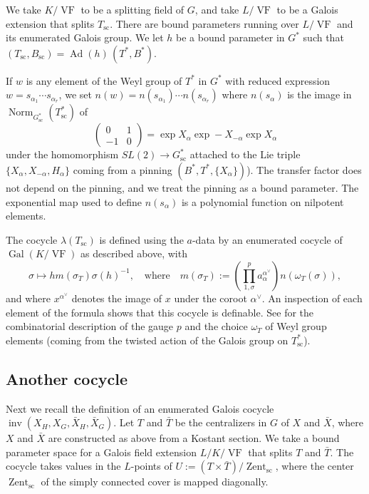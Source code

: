 \documentclass[12pt]{amsart}
\newcommand{\op}[1]{\operatorname{#1}}
\def\VF{{\op{VF}}}
\theoremstyle{plain}
\theoremstyle{definition}
\begin{document}
We take $K/\VF$ to be a splitting field of $G$, and take $L/\VF$ to be
a Galois extension that splits $T_{\text{sc}}$.  There are bound parameters
running over $L/\VF$ and its enumerated Galois group.  We let $h$ be a
bound parameter in $G^*$ such that $(T_{\text{sc}},B_{\text{sc}}) =
\op{Ad}(h)\,(T^*,B^*)$.

If $w$ is any element of the Weyl group of $T^*$ in $G^*$ with reduced
expression $w = s_{\alpha_1}\cdots s_{\alpha_r}$, we set $n(w) =
n(s_{\alpha_1})\cdots n(s_{\alpha_r})$ where
$n(s_\alpha)$ is the image
in $\op{Norm}_{G_{\text{sc}}^*}(T_{\text{sc}}^*)$ of
\[
\begin{pmatrix}0 &1\\ -1 & 0\end{pmatrix} = \op{exp} X_\alpha \op{exp} -
  X_{-\alpha} \op{exp} X_\alpha
\]
under the homomorphism $SL(2)\to G^*_{\text{sc}}$ attached to the Lie triple
$\{ X_\alpha,X_{-\alpha},H_\alpha \}$ coming from a pinning
$(B^*,T^*,\{X_\alpha\})$).  The transfer factor does not depend on the
pinning, and we treat the pinning as a bound parameter.  The
exponential map used to define $n(s_\alpha)$ is a polynomial function
on nilpotent elements.

The cocycle $\lambda(T_{\text{sc}})$ is defined using the $a$-data by an enumerated
cocycle of $\op{Gal}(K/\VF)$ as described above, with
\[
\sigma \mapsto h m(\sigma_T) \sigma(h)^{-1},\quad \text{where}\quad
m(\sigma_T):= \left( \prod_{1,\sigma}^p 
a_\alpha^{\alpha^\vee}\right) n(\omega_T(\sigma)),
\]
and where $x^{\alpha^\vee}$ denotes the image of $x$ under the coroot
$\alpha^\vee$.  An inspection of each element of the formula shows
that this cocycle is definable.  See \cite{LSxf} for the combinatorial
description of the gauge $p$ and the choice $\omega_T$ of Weyl group
elements (coming from the twisted action of the Galois group on
$T^*_{\text{sc}}$).

\subsection{Another cocycle}

Next we recall the definition of an enumerated Galois cocycle
$\op{inv}(X_H,X_G,\bar X_H,\bar X_G)$.  Let $T$ and $\bar T$ be the
centralizers in $G$ of $X$ and $\bar X$, where $X$ and $\bar X$ are
constructed as above from a Kostant section.  We take a bound
parameter space for a Galois field extension $L/K/\VF$ that splits $T$
and $\bar T$.  The cocycle takes values in the $L$-points of $U:=
(T\times \bar T)/\op{Zent}_{\text{sc}}$, where the center $\op{Zent}_{\text{sc}}$ of
the simply connected cover is mapped diagonally.
\end{document}
